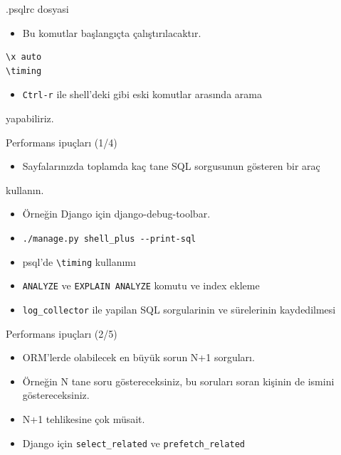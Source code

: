\documentclass[presentation]{beamer}
\begin{document}
\begin{frame}[fragile,label=sec-11]{.psqlrc dosyasi}
 \begin{itemize}
\item Bu komutlar başlangıçta çalıştırılacaktır.
\end{itemize}

\begin{verbatim}
\x auto
\timing
\end{verbatim}

\begin{itemize}
\item \texttt{Ctrl-r} ile shell'deki gibi eski komutlar arasında arama
\end{itemize}
yapabiliriz.
\end{frame}

\begin{frame}[fragile,label=sec-12]{Performans ipuçları (1/4)}
 \begin{itemize}
\item Sayfalarınızda toplamda kaç tane SQL sorgusunun gösteren bir araç
\end{itemize}
kullanın.
\begin{itemize}
\item Örneğin Django için django-debug-toolbar.
\item \texttt{./manage.py shell\_plus -{}-print-sql}
\item psql'de \texttt{\textbackslash{}timing} kullanımı
\item \texttt{ANALYZE} ve \texttt{EXPLAIN ANALYZE} komutu ve index ekleme
\item \texttt{log\_collector} ile yapilan SQL sorgularinin ve sürelerinin kaydedilmesi
\end{itemize}
\end{frame}

\begin{frame}[fragile,label=sec-13]{Performans ipuçları (2/5)}
 \begin{itemize}
\item ORM'lerde olabilecek en büyük sorun N+1 sorguları.
\item Örneğin N tane soru göstereceksiniz, bu soruları soran kişinin de ismini
göstereceksiniz.
\item N+1 tehlikesine çok müsait.
\item Django için \texttt{select\_related} ve \texttt{prefetch\_related}
\end{itemize}
\end{frame}
\end{document}
